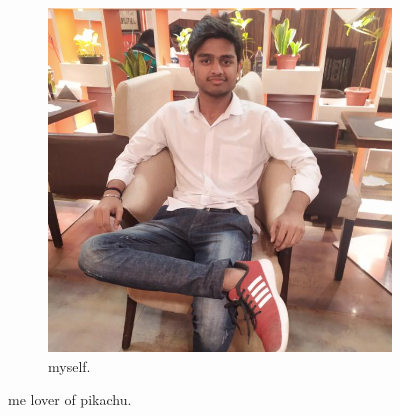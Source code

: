 \documentclass{article}
\begin{document}
\begin{figure}[H]
\begin{subfigure}[t]{0.5\linewidth}
    \includegraphics[width=\linewidth]{Personal.jpeg}
    \caption{myself.}
  \end{subfigure}
  \caption{me lover of pikachu.}
  \label{fig:more}
  \end{figure}
\end{document}
